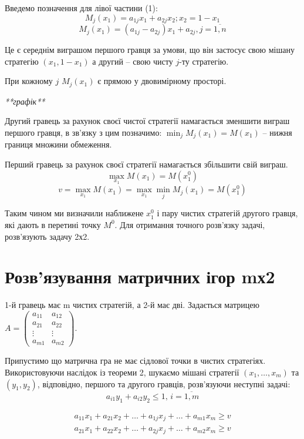 \documentclass[12pt,a4paper]{book}
\begin{document}
Введемо позначення для лівої частини (1):
\[M_j(x_1) = a_{1j}x_1+a_{2j}x_2; x_2=1-x_1\]
\begin{equation}
M_j(x_1)=(a_{1j}-a_{2j})x_1+a_{2j}, j=\overline{1,n}
\end{equation}

Це є середнім виграшом першого гравця за умови, що він застосує свою мішану стратегію $(x_1,1-x_1)$ а другий -- свою чисту $j$-ту стратегію.

При кожному $j$ $M_j(x_1)$ є прямою у двовимірному просторі.

\emph{**графік**}

Другий гравець за рахунок своєї чистої стратегії намагається зменшити виграш першого гравця, в зв'язку з цим позначимо:
$\displaystyle \min_jM_j(x_1)=M(x_1)$ -- нижня границя множини обмеження.

Перший гравець за рахунок своєї стратегії намагається збільшити свій виграш.
\[\max_{x_1} M(x_1) = M(x_1^0)\]
\[v=\max_{x_1} M(x_1)=\max_{x_1} \min_jM_j(x_1)=M(x_1^0)\]

Таким чином ми визначили наближене $x_1^0$ і пару чистих стратегій другого гравця, які дають в перетині точку $M^0$. Для отримання точного розв'язку задачі, розв'язують задачу 2х2. 

\section{Розв’язування матричних ігор mх2}

1-й гравець має m чистих стратегій, а 2-й має дві.
Задається матрицею $A=\left ( \begin{array}{cc}
a_{11}&a_{12}\\
a_{21}&a_{22}\\
\vdots&\vdots\\
a_{m1}&a_{m2}
\end{array}\right)$.

Припустимо що матрична гра не має сідлової точки в чистих стратегіях. Використовуючи наслідок із теореми 2, шукаємо мішані стратегії $(x_1,\dots, x_m)$ та $(y_1,y_2)$, відповідно, першого та другого гравців, розв'язуючи неступні задачі:
\begin{equation}
a_{i1}y_1+a_{i2}y_2 \le 1, \, i=\overline{1,m}
\end{equation}

\begin{equation}
\begin{array}{l}
a_{11}x_1+a_{21}x_2+\dots+a_{1j}x_j+\dots+a_{m1}x_m \ge v\\
a_{21}x_1+a_{22}x_2+\dots+a_{2j}x_j+\dots+a_{m2}x_m \ge v
\end{array}
\end{equation}
\end{document}
